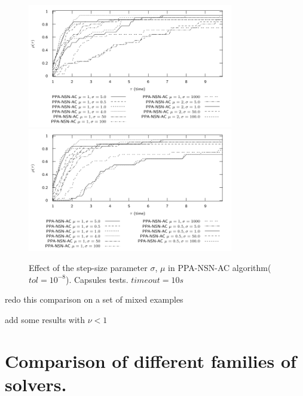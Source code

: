 \begin{figure}
  \centering
  \includegraphics[width=0.8\textwidth]{../figure/profile-Capsules-reduced-PPA-NSN-AC-1_10-time.pdf}
  \includegraphics[width=0.8\textwidth]{../figure/profile-Capsules-reduced-PPA-NSN-AC-1_10-time-bis.pdf}
   \caption{Effect of the step-size parameter $\sigma$, $\mu$ in PPA-NSN-AC algorithm( $tol = 10^{-8}$). Capsules tests. $timeout=10s$}
  \label{fig:profile-Capsules-reduced-PPA-NSN-AC-1_10-time}
\end{figure}
\begin{ndrva}
  \item redo this comparison on a set of mixed examples 
  \item add some results with $\nu < 1 $
\end{ndrva}


\section{Comparison of different families of solvers.}


